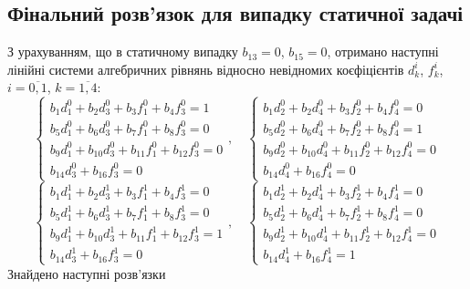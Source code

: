 \subsection*{Фінальний розв'язок для випадку статичної задачі}
З урахуванням, що в статичному випадку $b_{13} = 0$, $b_{15} = 0$,
отримано наступні лінійні системи алгебричних рівнянь відносно невідномих коєфіцієнтів $d_k^i$, $f_k^i$, $i=\overline{0,1}$, $k=\overline{1,4}$:
\begin{equation*}
    \begin{cases}
        b_1 d_1^0 + b_2 d_3^0 + b_3 f_1^0 + b_4 f_3^0 = 1 \\
        b_5 d_1^0 + b_6 d_3^0 + b_7 f_1^0 + b_8 f_3^0 = 0 \\
        b_9 d_1^0 + b_{10} d_3^0 + b_{11} f_1^0 + b_{12} f_3^0 = 0 \\
        b_{14} d_3^0 + b_{16} f_3^0 = 0
    \end{cases}, \quad
    \begin{cases}
        b_1 d_2^0 + b_2 d_4^0 + b_3 f_2^0 + b_4 f_4^0 = 0 \\
        b_5 d_2^0 + b_6 d_4^0 + b_7 f_2^0 + b_8 f_4^0 = 1 \\
        b_9 d_2^0 + b_{10} d_4^0 + b_{11} f_2^0 + b_{12} f_4^0 = 0 \\
        b_{14} d_4^0 + b_{16} f_4^0 = 0
    \end{cases}
\end{equation*}
\begin{equation*}
    \begin{cases}
        b_1 d_1^1 + b_2 d_3^1 + b_3 f_1^1 + b_4 f_3^1 = 0 \\
        b_5 d_1^1 + b_6 d_3^1 + b_7 f_1^1 + b_8 f_3^1 = 0 \\
        b_9 d_1^1 + b_{10} d_3^1 + b_{11} f_1^1 + b_{12} f_3^1 = 1 \\
       b_{14} d_3^1 + b_{16} f_3^1 = 0
    \end{cases}, \quad
    \begin{cases}
        b_1 d_2^1 + b_2 d_4^1 + b_3 f_2^1 + b_4 f_4^1 = 0 \\
        b_5 d_2^1 + b_6 d_4^1 + b_7 f_2^1 + b_8 f_4^1 = 0 \\
        b_9 d_2^1 + b_{10} d_4^1 + b_{11} f_2^1 + b_{12} f_4^1 = 0 \\
        b_{14} d_4^1 + b_{16} f_4^1 = 1
    \end{cases}
\end{equation*}
Знайдено наступні розв'язки


